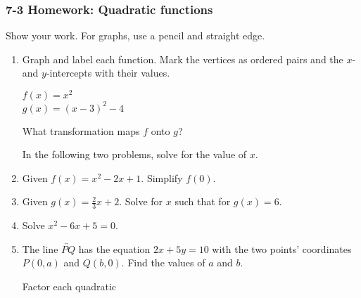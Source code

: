 \documentclass[12pt, twoside]{article}
\begin{document}
\subsubsection*{7-3 Homework: Quadratic functions}
Show your work. For graphs, use a pencil and straight edge.
  \begin{enumerate}

\item Graph and label each function. Mark the vertices as ordered pairs and the $x$- and $y$-intercepts with their values.
        \vspace{0.25cm}
        \begin{multicols}{2}
          $f(x)=x^2$\\
          $g(x)=(x-3)^2-4$
        \end{multicols}
        What transformation maps $f$ onto $g$?
        \vspace{2.25cm}

    \begin{center} %
    \end{center}


    In the following two problems, solve for the value of $x$.

\newpage

\item Given $f(x)=x^2-2x+1$. Simplify $f(0)$. \vspace{2cm}
\item Given $g(x)=\frac{2}{3} x+2$. Solve for $x$ such that for $g(x)=6$. \vspace{2.5cm}
\item Solve $x^2-6x+5=0$. \vspace{3cm}

\item The line $\overleftrightarrow{PQ}$ has the equation $2x+5y=10$ with the two points' coordinates $P(0,a)$ and $Q(b,0)$. Find the values of $a$ and $b$. \vspace{5cm}

Factor each quadratic


\end{enumerate}
\end{document}
